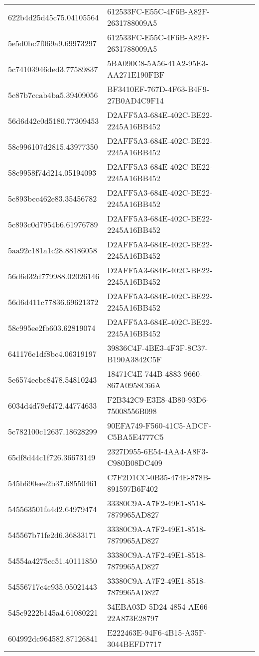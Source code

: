 \begin{tabular}{ll}
622b4d25d45c75.04105564 & 612533FC-E55C-4F6B-A82F-2631788009A5 \\
5e5d0bc7f069a9.69973297 & 612533FC-E55C-4F6B-A82F-2631788009A5 \\
5c74103946ded3.77589837 & 5BA090C8-5A56-41A2-95E3-AA271E190FBF \\
5c87b7ccab4ba5.39409056 & BF3410EF-767D-4F63-B4F9-27B0AD4C9F14 \\
56d6d42c0d5180.77309453 & D2AFF5A3-684E-402C-BE22-2245A16BB452 \\
58c996107d2815.43977350 & D2AFF5A3-684E-402C-BE22-2245A16BB452 \\
58c9958f74d214.05194093 & D2AFF5A3-684E-402C-BE22-2245A16BB452 \\
5c893bec462e83.35456782 & D2AFF5A3-684E-402C-BE22-2245A16BB452 \\
5c893c0d7954b6.61976789 & D2AFF5A3-684E-402C-BE22-2245A16BB452 \\
5aa92c181a1c28.88186058 & D2AFF5A3-684E-402C-BE22-2245A16BB452 \\
56d6d32d779988.02026146 & D2AFF5A3-684E-402C-BE22-2245A16BB452 \\
56d6d411c77836.69621372 & D2AFF5A3-684E-402C-BE22-2245A16BB452 \\
58c995ee2fb603.62819074 & D2AFF5A3-684E-402C-BE22-2245A16BB452 \\
641176e1df8bc4.06319197 & 39836C4F-4BE3-4F3F-8C37-B190A3842C5F \\
5e6574ecbc8478.54810243 & 18471C4E-744B-4883-9660-867A0958C66A \\
6034d4d79ef472.44774633 & F2B342C9-E3E8-4B80-93D6-75008556B098 \\
5c782100c12637.18628299 & 90EFA749-F560-41C5-ADCF-C5BA5E4777C5 \\
65df8d44c1f726.36673149 & 2327D955-6E54-4AA4-A8F3-C980B08DC409 \\
545b690eee2b37.68550461 & C7F2D1CC-0B35-474E-878B-891597B6F402 \\
545563501fa4d2.64979474 & 33380C9A-A7F2-49E1-8518-7879965AD827 \\
545567b71fe2d6.36833171 & 33380C9A-A7F2-49E1-8518-7879965AD827 \\
54554a4275cc51.40111850 & 33380C9A-A7F2-49E1-8518-7879965AD827 \\
54556717c4c935.05021443 & 33380C9A-A7F2-49E1-8518-7879965AD827 \\
545c9222b145a4.61080221 & 34EBA03D-5D24-4854-AE66-22A873E28797 \\
604992dc964582.87126841 & E222463E-94F6-4B15-A35F-3044BEFD7717 \\

\end{tabular}
